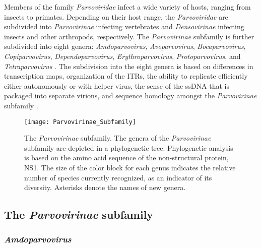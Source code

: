 Members of the family \textit{Parvoviridae} infect a wide variety of hosts, ranging from insects to primates.
Depending on their host range, the \textit{Parvoviridae} are subdivided into \textit{Parvovirinae} infecting vertebrates and \textit{Densovirinae} infecting insects and other arthropods, respectively. The \textit{Parvovirinae} subfamily is further subdivided into eight genera: \textit{Amdoparvovirus}, \textit{Aveparvovirus}, \textit{Bocaparvovirus}, \textit{Copiparvovirus}, \textit{Dependoparvovirus}, \textit{Erythroparvovirus}, \textit{Protoparvovirus}, and \textit{Tetraparvovirus} \cite{pmid24212889}. The subdivision into the eight genera is based on differences in transcription maps, organization of the ITRs, the ability to replicate efficiently either autonomously or with helper virus, the sense of the ssDNA that is packaged into separate virions, and sequence homology amongst the \textit{Parvovirinae} subfamily \cite{pmid11222696, icvt}.


\begin{figure}
  \centering
  \texttt{[image: Parvovirinae\_Subfamily]}
  \vspace{-25em}
  \caption[The \textit{Parvovirinae} subfamily]
   {The \textit{Parvovirinae} subfamily. The genera of the \textit{Parvovirinae} subfamily are depicted in a phylogenetic tree. Phylogenetic analysis is based on the amino acid sequence of the non-structural protein, NS1. The size of the color block for each genus indicates the relative number of species currently recognized, as an indicator of its diversity. Asterisks denote the names of new genera.} 

\end{figure}



\subsection{The \textit{Parvovirinae} subfamily}
\label{sec: The Parvovirinae subfamily}   


\subsubsection{\textit{Amdoparvovirus}}


